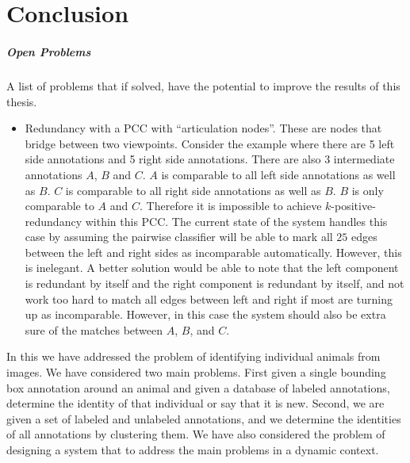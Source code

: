 \begin{comment}
    ./texfix.py --fpaths chapter6-conclusion.tex --outline --asmarkdown --numlines=99 -w
\end{comment}

\chapter{Conclusion}\label{chap:conclusion} %


    \paragraph{Open Problems} A list of problems that if solved, have the
      potential to improve the results of this thesis.
    \begin{itemize}
        \item Redundancy with a PCC with ``articulation nodes''.
        These are nodes that bridge between two viewpoints.
        Consider the example where there are 5 left side annotations and 5
          right side annotations.
        There are also 3 intermediate annotations $A$, $B$ and $C$.
        $A$ is comparable to all left side annotations as well as $B$.
        $C$ is comparable to all right side annotations as well as $B$.
        $B$ is only comparable to $A$ and $C$.
        Therefore it is impossible to achieve $k$-positive-redundancy within
          this PCC.
        The current state of the system handles this case by assuming the
          pairwise classifier will be able to mark all $25$ edges between the
          left and right sides as incomparable automatically.
        However, this is inelegant.
        A better solution would be able to note that the left component is
          redundant by itself and the right component is redundant by itself,
          and not work too hard to match all edges between left and right if
          most are turning up as incomparable.
        However, in this case the system should also be extra sure of the
          matches between $A$, $B$, and $C$.



    \end{itemize}

    In this \thesis{} we have addressed the problem of identifying individual
      animals from images.
    We have considered two main problems.
    First given a single bounding box annotation around an animal and given a
      database of labeled annotations, determine the identity of that individual
      or say that it is new.
    Second, we are given a set of labeled and unlabeled annotations, and we
      determine the identities of all annotations by clustering them.
    We have also considered the problem of designing a system that to address
      the main problems in a dynamic context.


